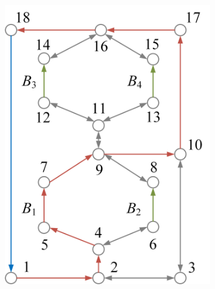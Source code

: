 \documentclass{article}
\begin{document}
\begin{figure}[htbp]
    \centering
    \begin{subfigure}[b]{0.45\textwidth}
        \includegraphics[width=\textwidth]{../attachments/ef-sp1.png}
        \caption{}
        \label{fig:sp1}
    \end{subfigure}
    \hspace{0.05\textwidth}
    \begin{subfigure}[b]{0.45\textwidth}

\end{subfigure}
\end{figure}
\end{document}
